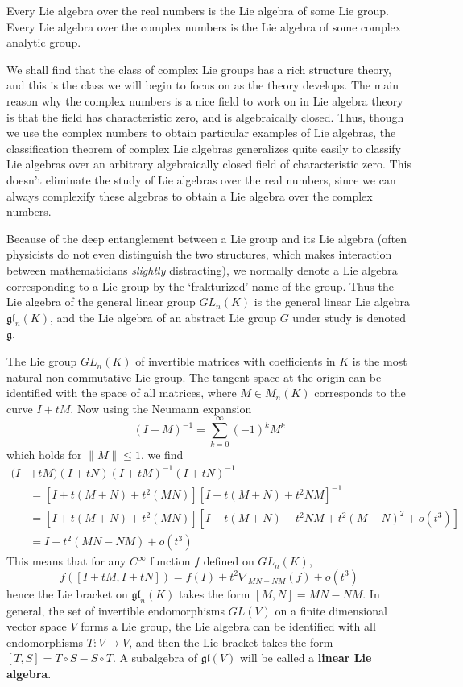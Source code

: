 \begin{fact}
    Every Lie algebra over the real numbers is the Lie algebra of some Lie group. Every Lie algebra over the complex numbers is the Lie algebra of some complex analytic group.
\end{fact}
%
We shall find that the class of complex Lie groups has a rich structure theory, and this is the class we will begin to focus on as the theory develops. The main reason why the complex numbers is a nice field to work on in Lie algebra theory is that the field has characteristic zero, and is algebraically closed. Thus, though we use the complex numbers to obtain particular examples of Lie algebras, the classification theorem of complex Lie algebras generalizes quite easily to classify Lie algebras over an arbitrary algebraically closed field of characteristic zero. This doesn't eliminate the study of Lie algebras over the real numbers, since we can always complexify these algebras to obtain a Lie algebra over the complex numbers.

Because of the deep entanglement between a Lie group and its Lie algebra (often physicists do not even distinguish the two structures, which makes interaction between mathematicians {\it slightly} distracting), we normally denote a Lie algebra corresponding to a Lie group by the `frakturized' name of the group. Thus the Lie algebra of the general linear group $GL_n(K)$ is the general linear Lie algebra $\mathfrak{gl}_n(K)$, and the Lie algebra of an abstract Lie group $G$ under study is denoted $\mathfrak{g}$.

\begin{example}
    The Lie group $GL_n(K)$ of invertible matrices with coefficients in $K$ is the most natural non commutative Lie group. The tangent space at the origin can be identified with the space of all matrices, where $M \in M_n(K)$ corresponds to the curve $I + tM$. Now using the Neumann expansion
    \[ (I + M)^{-1} = \sum_{k = 0}^\infty (-1)^k M^k \]
    which holds for $\| M \| \leq 1$, we find
    \begin{align*}
        (I& + tM)(I + tN)(I + tM)^{-1}(I + tN)^{-1}\\
        &= [I + t(M + N) + t^2(MN)][I + t(M + N) + t^2NM]^{-1}\\
        &= [I + t(M + N) + t^2(MN)][I - t(M + N) - t^2NM + t^2(M + N)^2 + o(t^3)]\\
        &= I + t^2(MN - NM) + o(t^3)
    \end{align*}
    This means that for any $C^\infty$ function $f$ defined on $GL_n(K)$,
    \[ f([I + tM, I + tN]) = f(I) + t^2 \nabla_{MN - NM}(f) + o(t^3) \]
    hence the Lie bracket on $\mathfrak{gl}_n(K)$ takes the form $[M,N] = MN - NM$. In general, the set of invertible endomorphisms $GL(V)$ on a finite dimensional vector space $V$ forms a Lie group, the Lie algebra can be identified with all endomorphisms $T: V \to V$, and then the Lie bracket takes the form $[T,S] = T \circ S - S \circ T$. A subalgebra of $\mathfrak{gl}(V)$ will be called a {\bf linear Lie algebra}.
\end{example}

